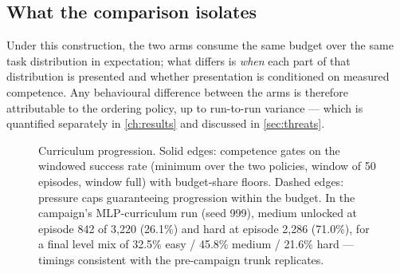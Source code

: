 \subsection{What the comparison isolates}
\label{sec:isolation}

Under this construction, the two arms consume the same budget over the
same task distribution in expectation; what differs is \emph{when} each
part of that distribution is presented and whether presentation is
conditioned on measured competence. Any behavioural difference between the
arms is therefore attributable to the ordering policy, up to run-to-run
variance --- which is quantified separately in \cref{ch:results} and
discussed in \cref{sec:threats}.

\begin{figure}[t]
  \centering
  \caption{Curriculum progression. Solid edges: competence gates on the
  windowed success rate (minimum over the two policies, window of 50
  episodes, window full) with budget-share floors. Dashed edges: pressure
  caps guaranteeing progression within the budget. In the campaign's
  MLP-curriculum run (seed 999), medium unlocked at episode 842 of 3{,}220
  (26.1\%) and hard at episode 2{,}286 (71.0\%), for a final level mix of
  32.5\% easy / 45.8\% medium / 21.6\% hard --- timings consistent with
  the pre-campaign trunk replicates.}
  \label{fig:curriculum-fsm}
\end{figure}

